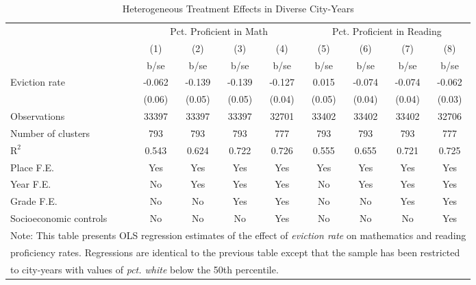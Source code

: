 \begin{table}[htbp]\centering
\def\sym#1{\ifmmode^{#1}\else\(^{#1}\)\fi}
\caption{Heterogeneous Treatment Effects in Diverse City-Years}
\begin{tabular}{l*{8}{c}}
\toprule
                    &\multicolumn{4}{c}{Pct. Proficient in Math}        &\multicolumn{4}{c}{Pct. Proficient in Reading}     \\\cmidrule(lr){2-5}\cmidrule(lr){6-9}
                    &\multicolumn{1}{c}{(1)}&\multicolumn{1}{c}{(2)}&\multicolumn{1}{c}{(3)}&\multicolumn{1}{c}{(4)}&\multicolumn{1}{c}{(5)}&\multicolumn{1}{c}{(6)}&\multicolumn{1}{c}{(7)}&\multicolumn{1}{c}{(8)}\\
                    &        b/se&        b/se&        b/se&        b/se&        b/se&        b/se&        b/se&        b/se\\
\midrule
Eviction rate       &      -0.062&      -0.139&      -0.139&      -0.127&       0.015&      -0.074&      -0.074&      -0.062\\
                    &      (0.06)&      (0.05)&      (0.05)&      (0.04)&      (0.05)&      (0.04)&      (0.04)&      (0.03)\\
\midrule
Observations        &       33397&       33397&       33397&       32701&       33402&       33402&       33402&       32706\\
Number of clusters  &         793&         793&         793&         777&         793&         793&         793&         777\\
$\text{R}^2$        &       0.543&       0.624&       0.722&       0.726&       0.555&       0.655&       0.721&       0.725\\
Place F.E.          &         Yes&         Yes&         Yes&         Yes&         Yes&         Yes&         Yes&         Yes\\
Year F.E.           &          No&         Yes&         Yes&         Yes&          No&         Yes&         Yes&         Yes\\
Grade F.E.          &          No&          No&         Yes&         Yes&          No&          No&         Yes&         Yes\\
Socioeconomic controls&          No&          No&          No&         Yes&          No&          No&          No&         Yes\\
\bottomrule
\multicolumn{9}{l}{\footnotesize Note: This table presents OLS regression estimates of the effect of \emph{eviction rate} on mathematics and reading}\\
\multicolumn{9}{l}{\footnotesize proficiency rates. Regressions are identical to the previous table except that the sample has been restricted}\\
\multicolumn{9}{l}{\footnotesize to city-years with values of \emph{pct. white} below the 50th percentile.}\\
\end{tabular}
\end{table}
